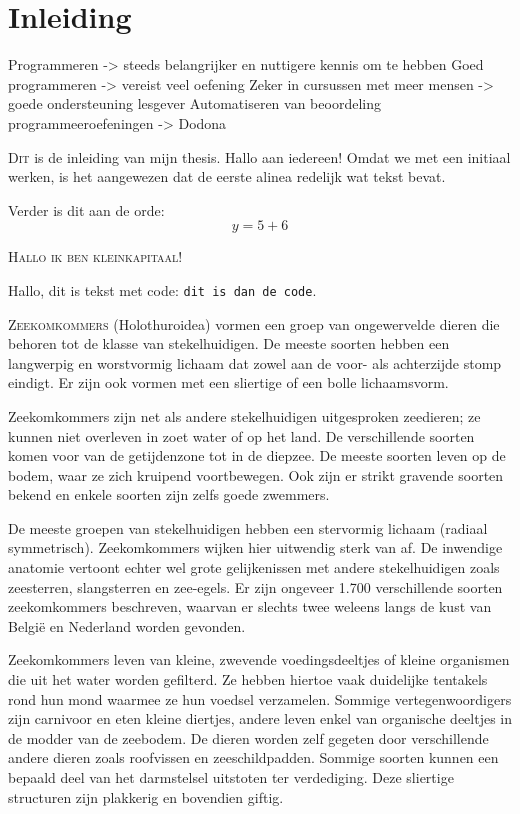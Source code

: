 \chapter{Inleiding}\label{ch:inleiding}

Programmeren -> steeds belangrijker en nuttigere kennis om te hebben
Goed programmeren -> vereist veel oefening
Zeker in cursussen met meer mensen -> goede ondersteuning lesgever
Automatiseren van beoordeling programmeeroefeningen -> Dodona

\lettrine{D}{it} is de inleiding van mijn thesis.
Hallo aan iedereen!
Omdat we met een initiaal werken, is het aangewezen dat de eerste alinea redelijk wat tekst bevat.


Verder is dit aan de orde:
\[
    y = 5 + 6
\]

\textsc{Hallo ik ben kleinkapitaal!}

Hallo, dit is tekst met code: \texttt{dit is dan de code}.

\lettrine{Z}{eekomkommers} (Holothuroidea) vormen een groep van ongewervelde dieren die behoren tot de klasse van stekelhuidigen.
De meeste soorten hebben een langwerpig en worstvormig lichaam dat zowel aan de voor- als achterzijde stomp eindigt.
Er zijn ook vormen met een sliertige of een bolle lichaamsvorm.

Zeekomkommers zijn net als andere stekelhuidigen uitgesproken zeedieren;
ze kunnen niet overleven in zoet water of op het land.
De verschillende soorten komen voor van de getijdenzone tot in de diepzee.
De meeste soorten leven op de bodem, waar ze zich kruipend voortbewegen.
Ook zijn er strikt gravende soorten bekend en enkele soorten zijn zelfs goede zwemmers.

De meeste groepen van stekelhuidigen hebben een stervormig lichaam (radiaal symmetrisch).
Zeekomkommers wijken hier uitwendig sterk van af.
De inwendige anatomie vertoont echter wel grote gelijkenissen met andere stekelhuidigen zoals zeesterren, slangsterren en zee-egels.
Er zijn ongeveer 1.700 verschillende soorten zeekomkommers beschreven, waarvan er slechts twee weleens langs de kust van België en Nederland worden gevonden.

Zeekomkommers leven van kleine, zwevende voedingsdeeltjes of kleine organismen die uit het water worden gefilterd.
Ze hebben hiertoe vaak duidelijke tentakels rond hun mond waarmee ze hun voedsel verzamelen.
Sommige vertegenwoordigers zijn carnivoor en eten kleine diertjes, andere leven enkel van organische deeltjes in de modder van de zeebodem.
De dieren worden zelf gegeten door verschillende andere dieren zoals roofvissen en zeeschildpadden.
Sommige soorten kunnen een bepaald deel van het darmstelsel uitstoten ter verdediging.
Deze sliertige structuren zijn plakkerig en bovendien giftig.

